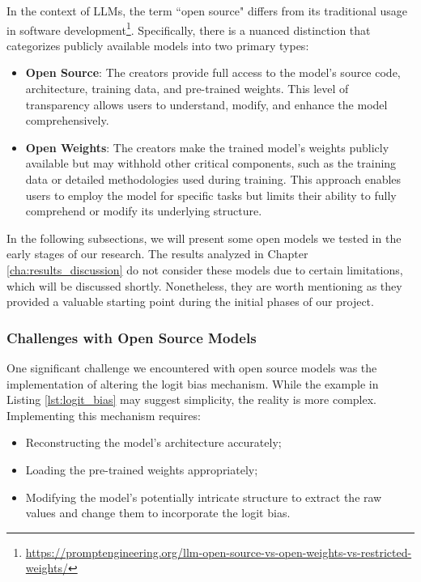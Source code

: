 In the context of LLMs, the term ``open source" differs from its traditional
usage in software development\footnote{\url{https://promptengineering.org/llm-open-source-vs-open-weights-vs-restricted-weights/}}.
Specifically, there is a nuanced distinction that categorizes publicly available
models into two primary types:

\begin{itemize}
  \item \textbf{Open Source}: The creators provide full access to the model's source
    code, architecture, training data, and pre-trained weights. This level of transparency
    allows users to understand, modify, and enhance the model comprehensively.

  \item \textbf{Open Weights}: The creators make the trained model's weights publicly
    available but may withhold other critical components, such as the training
    data or detailed methodologies used during training. This approach enables users
    to employ the model for specific tasks but limits their ability to fully comprehend
    or modify its underlying structure.
\end{itemize}

In the following subsections, we will present some open models we tested in the early
stages of our research. The results analyzed in Chapter
\ref{cha:results_discussion} do not consider these models due to certain
limitations, which will be discussed shortly. Nonetheless, they are worth mentioning
as they provided a valuable starting point during the initial phases of our project.

\subsubsection{Challenges with Open Source Models}

One significant challenge we encountered with open source models was the
implementation of altering the logit bias mechanism. While the example in Listing
\ref{lst:logit_bias} may suggest simplicity, the reality is more complex. Implementing
this mechanism requires:

\begin{itemize}
  \item Reconstructing the model's architecture accurately;

  \item Loading the pre-trained weights appropriately;

  \item Modifying the model's potentially intricate structure to extract the raw
    values and change them to incorporate the logit bias.
\end{itemize}

